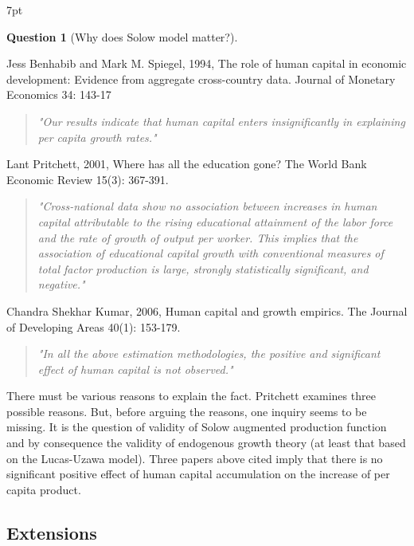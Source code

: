 \documentclass{article}
\newenvironment{greenblock}{%
\def\FrameCommand{%
  \hspace{1pt}%
    {\color{Green}%
    \vrule width 2pt}%
    {\color{greenshade}%
    \vrule width 4pt}%
  \colorbox{greenshade}%
}%
\MakeFramed{%
  \advance%
  \hsize-%
  \width%
  \FrameRestore}%
\noindent\hspace{-4.55pt}%
\begin{adjustwidth}{}{7pt}%
\vspace{2pt}\vspace{2pt}%
}
{%
\vspace{2pt}\end{adjustwidth}\endMakeFramed%
}
\newtheorem{question}{Question}
\begin{document}
\begin{greenblock}
\begin{question}[Why does Solow model matter?]
\end{question}
Jess Benhabib and Mark M. Spiegel, 1994, The role of human capital in economic development: Evidence from aggregate cross-country data. Journal of Monetary Economics 34: 143-17

\begin{quote}
\textit{"Our results indicate that human capital enters insignificantly in explaining per capita growth rates."}
\end{quote}

Lant Pritchett, 2001, Where has all the education gone? The World Bank Economic Review 15(3): 367-391.

\begin{quote}
\textit{"Cross-national data show no association between increases in human capital attributable to the rising educational attainment of the labor force and the rate of growth of output per worker. This implies that the association of educational capital growth with conventional measures of total factor production is large, strongly statistically significant, and negative."}
\end{quote}

Chandra Shekhar Kumar, 2006, Human capital and growth empirics. The Journal of Developing Areas 40(1): 153-179.

\begin{quote}
\textit{"In all the above estimation methodologies, the positive and significant effect of human capital is not observed."}
\end{quote}

There must be various reasons to explain the fact. Pritchett examines three possible reasons. But, before arguing the reasons, one inquiry seems to be missing. It is the question of validity of Solow augmented production function and by consequence the validity of endogenous growth theory (at least that based on the Lucas-Uzawa model). Three papers above cited imply that there is no significant positive effect of human capital accumulation on the increase of per capita product.

\end{greenblock}


\subsection{Extensions}
\end{document}
